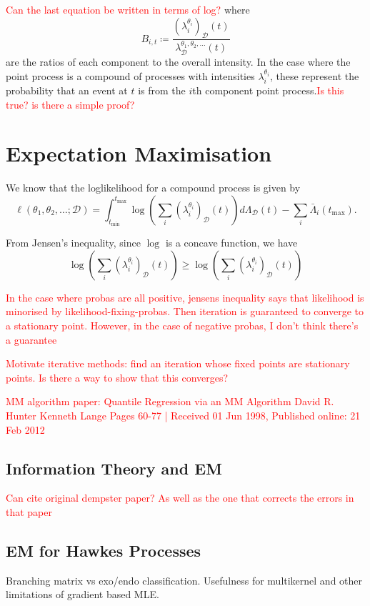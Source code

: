 \documentclass[honours,12pt]{unswthesis}
\numberwithin{equation}{section}
\begin{document}
\textcolor{red}{Can the last equation be written in terms of log?}
where
$$B_{i,t} \coloneq \frac{\left(\lambda_i^{\theta_i}\right)_\mathcal{D}(t)}{\lambda_\mathcal{D}^{\theta_1,\theta_2,\ldots}(t)}$$
are the ratios of each component to the overall intensity. In the case where the point process is a compound of processes with intensities $\lambda_i^{\theta_i}$, these represent the probability that an event at $t$ is from the $i$th component point process.\textcolor{red}{Is this true? is there a simple proof?}

\section{Expectation Maximisation}
We know that the loglikelihood for a compound process is given by
$$\ell(\theta_1,\theta_2,\ldots;\mathcal{D}) = \int_{t_\mathrm{min}}^{t_\mathrm{max}}\log\left(\sum_i \left(\lambda_i^{\theta_i}\right)_{\mathcal{D}}(t)\right)d\Lambda_\mathcal{D}(t)-\sum_i \bar\Lambda_i\left(t_\mathrm{max}\right).$$

From Jensen's inequality, since $\log$ is a concave function, we have
$$\log\left(\sum_i \left(\lambda_i^{\theta_i}\right)_{\mathcal{D}}(t)\right) \geq \log\left(\sum_i \left(\lambda_i^{\theta_i}\right)_{\mathcal{D}}(t)\right)$$

\textcolor{red}{In the case where probas are all positive, jensens inequality says that likelihood is minorised by likelihood-fixing-probas. Then iteration is guaranteed to converge to a stationary point. However, in the case of negative probas, I don't think there's a guarantee}

\textcolor{red}{Motivate iterative methods: find an iteration whose fixed points are stationary points. Is there a way to show that this converges?}

\textcolor{red}{MM algorithm paper:   Quantile Regression via an MM Algorithm David R. Hunter Kenneth Lange Pages 60-77 | Received 01 Jun 1998, Published online: 21 Feb 2012}

\subsection{Information Theory and EM}
\textcolor{red}{Can cite original dempster paper? As well as the one that corrects the errors in that paper}

\subsection{EM for Hawkes Processes}
Branching matrix vs exo/endo classification. Usefulness for multikernel and other limitations of gradient based MLE.
\end{document}
